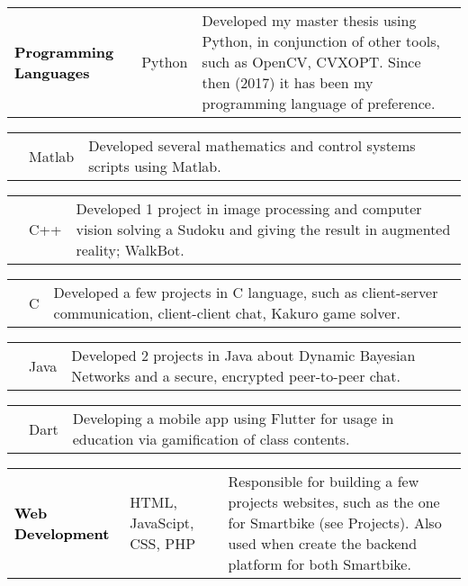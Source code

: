 \vspace{7pt}


\begin{tabular*}{1\textwidth}{p{} p{} p{9.8cm} }
\textcolor{black}{\textbf{Programming Languages}} & \textcolor{bgcol}{Python} & Developed my master thesis using Python, in conjunction of other tools, such as OpenCV, CVXOPT. Since then (2017) it has been my programming language of preference. \\
\end{tabular*}
\begin{tabular*}{1\textwidth}{p{} p{} p{9.8cm} }
& \textcolor{bgcol}{Matlab} & Developed several mathematics and control systems scripts using Matlab.\\
\end{tabular*}
\begin{tabular*}{1\textwidth}{p{} p{} p{9.8cm} }
& \textcolor{bgcol}{C++} & Developed 1 project in image processing and computer vision solving a Sudoku and giving the result in augmented reality; WalkBot.\\
\end{tabular*}
\begin{tabular*}{1\textwidth}{p{} p{} p{9.8cm} }
& \textcolor{bgcol}{C} & Developed a few projects in C language, such as client-server communication, client-client chat, Kakuro game solver.\\
\end{tabular*}
\begin{tabular*}{1\textwidth}{p{} p{} p{9.8cm} }
& \textcolor{bgcol}{Java} & Developed 2 projects in Java about Dynamic Bayesian Networks and a secure, encrypted peer-to-peer chat.\\
\end{tabular*}
\begin{tabular*}{1\textwidth}{p{} p{} p{9.8cm} }
& \textcolor{bgcol}{Dart} & Developing a mobile app using Flutter for usage in education via gamification of class contents.\\
\end{tabular*}
\begin{tabular*}{1\textwidth}{p{} p{} p{9.8cm} }
\textcolor{black}{\textbf{Web Development}} & \textcolor{bgcol}{HTML, JavaScipt, CSS, PHP} & Responsible for building a few projects websites, such as the one for Smartbike (see Projects). Also used when create the backend platform for both Smartbike. \\
\end{tabular*}
